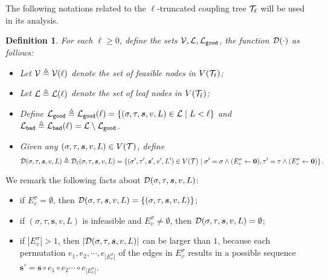 \documentclass[11pt]{article}
\newtheorem{definition}[theorem]{Definition}
\newcommand{\abs}[1]{\left\vert#1\right\vert}
\newcommand{\set}[1]{\left\{#1\right\}}
\renewcommand{\mid}{\;\middle\vert\;} \newcommand{\cmid}{\,:\,}
\newcommand{\defeq}{\triangleq} \renewcommand{\d}{\,\-d}
\def\!#1{\mathtt{#1}}
\newcommand{\Par}{\!{Par}}
\newcommand{\seqS}{\boldsymbol{s}}
\newcommand{\zdtodo}[1]{\todo[color = blue!40, size = \tiny]{\textbf{zhidan:} #1}}
\newcommand{\qtodo}[1]{\todo[color = purple!40, size = \tiny]{\textbf{guoliang:} #1}}
\newcommand{\zdnew}[1]{{\color{cyan} #1}}
\begin{document}



The following notations related to the $\ell$-truncated coupling tree $\mathcal{T}_{\ell}$ will be used in its analysis.
\begin{definition}\label{def-notation-v-tct}
For each $\ell\geq 0$, define the sets $\+V,\+L,\+L_{\!{good}}$, the function $\mathcal{D}(\cdot)$ as follows:
\begin{itemize}
\item Let $\mathcal{V}\triangleq \mathcal{V}(\ell)$ denote the set of \emph{feasible} nodes in $V(\mathcal{T}_{\ell})$;
\item Let $\mathcal{L}\triangleq \mathcal{L}(\ell)$ denote the set of leaf nodes in $V(\mathcal{T}_{\ell})$;
\item Define $\+L_{\!{good}}\triangleq \+L_{\!{good}}(\ell) = \set{(\sigma,\tau, \seqS,v,L) \in \+L\mid L<\ell}$ and $\+L_{\!{bad}}\triangleq \+L_{\!{bad}}(\ell) = \+L\setminus \+L_{\!{good}}$.
\item Given any $(\sigma,\tau,\seqS,v,L)\in V(\+T)$, define 
\[
\+D(\sigma,\tau,\seqS,v,L)\triangleq \+D_{\ell}(\sigma,\tau,\seqS,v,L) = \left\{(\sigma',\tau',\seqS',v',L')\in V(\+T) \mid \sigma' = \sigma \land (E^{\sigma}_v \gets \boldsymbol{0}),\tau' = \tau \land (E^{\sigma}_v \gets \boldsymbol{0})\right\}.
\]
\end{itemize}
\end{definition}
We remark the following facts about $\+D(\sigma,\tau,\seqS,v,L)$:
\begin{itemize}
\item if $E^{\sigma}_v = \emptyset$, then $\+D(\sigma,\tau,\seqS,v,L) = \{(\sigma,\tau,\seqS,v,L)\}$;
\item if $(\sigma,\tau,\seqS,v,L)$ is infeasible and $E^{\sigma}_v \neq \emptyset$, then 
$\+D(\sigma,\tau,\seqS,v,L) =\emptyset$; 
\item if $\abs{E^{\sigma}_v} > 1$, then $\abs{\+D(\sigma,\tau,\seqS,v,L)}$ can be larger than $1$, because each permutation $e_1,e_2,\cdots,e_{\abs{E^{\sigma}_v}}$ of the edges in $E^{\sigma}_v$ results in a possible sequence $\seqS' = \seqS\circ e_1 \circ e_2\cdots\circ e_{\abs{E^{\sigma}_v}}$.
\end{itemize}
\end{document}
